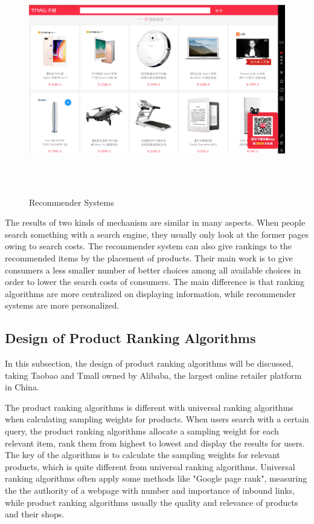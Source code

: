 \documentclass{article}
\begin{document}
\begin{figure}[H]
\centering
\includegraphics[width=16cm, height=10cm]{graphs/recommend.jpg}
\caption{\label{recommend}Recommender Systems}
\end{figure} 

The results of two kinds of mechanism are similar in many aspects. When people search something with a search engine, they usually only look at the former pages owing to search costs. The recommender system can also give rankings to the recommended items by the placement of products. Their main work is to give consumers a less smaller number of better choices among all available choices in order to lower the search costs of consumers. The main difference is that ranking algorithms are more centralized on displaying information, while recommender systems are more personalized. 

\subsection{Design of Product Ranking Algorithms}

In this subsection, the design of product ranking algorithms will be discussed, taking Taobao and Tmall owned by Alibaba, the largest online retailer platform in China. 

The product ranking algorithms is different with universal ranking algorithms when calculating sampling weights for products. When users search with a certain query, the product ranking algorithms allocate a sampling weight for each relevant item, rank them from highest to lowest and display the results for users. The key of the algorithms is to calculate the sampling weights for relevant products, which is quite different from universal ranking algorithms. Universal ranking algorithms often apply some methods like "Google page rank", measuring the the authority of a webpage with number and importance of inbound links, while product ranking algorithms usually the quality and relevance of products and their shops. 
\end{document}
